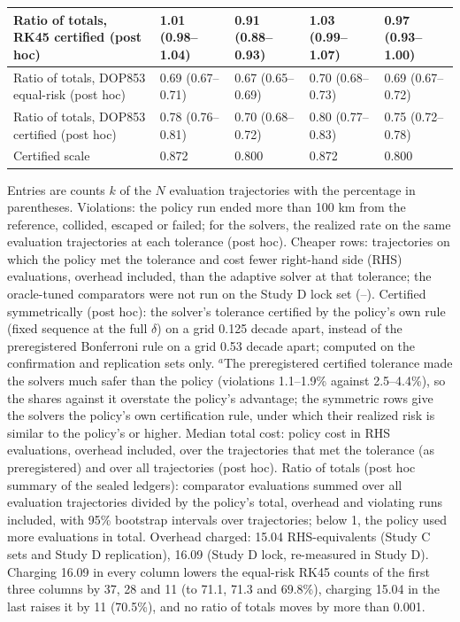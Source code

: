 \documentclass[10pt,letterpaper]{article}
\newlength\savedwidth
\newcommand\thickhline{\noalign{\global\savedwidth\arrayrulewidth\global\arrayrulewidth 2pt}%
\hline
\noalign{\global\arrayrulewidth\savedwidth}}
\begin{document}
\begin{table}[!htbp]
\begin{tabular}{|L{1.55in}|L{0.95in}|L{0.95in}|L{0.8in}|L{0.8in}|}
Ratio of totals, RK45 certified (post hoc) & 1.01 (0.98--1.04) & 0.91 (0.88--0.93) & 1.03 (0.99--1.07) & 0.97 (0.93--1.00) \\ \hline
Ratio of totals, DOP853 equal-risk (post hoc) & 0.69 (0.67--0.71) & 0.67 (0.65--0.69) & 0.70 (0.68--0.73) & 0.69 (0.67--0.72) \\ \hline
Ratio of totals, DOP853 certified (post hoc) & 0.78 (0.76--0.81) & 0.70 (0.68--0.72) & 0.80 (0.77--0.83) & 0.75 (0.72--0.78) \\ \thickhline
Certified scale & 0.872 & 0.800 & 0.872 & 0.800 \\ \hline
\end{tabular}
\begin{flushleft} Entries are counts $k$ of the $N$ evaluation trajectories with the percentage in parentheses. Violations: the policy run ended more than 100 km from the reference, collided, escaped or failed; for the solvers, the realized rate on the same evaluation trajectories at each tolerance (post hoc). Cheaper rows: trajectories on which the policy met the tolerance and cost fewer right-hand side (RHS) evaluations, overhead included, than the adaptive solver at that tolerance; the oracle-tuned comparators were not run on the Study D lock set (--). Certified symmetrically (post hoc): the solver's tolerance certified by the policy's own rule (fixed sequence at the full $\delta$) on a grid 0.125 decade apart, instead of the preregistered Bonferroni rule on a grid 0.53 decade apart; computed on the confirmation and replication sets only. $^{a}$The preregistered certified tolerance made the solvers much safer than the policy (violations 1.1--1.9\% against 2.5--4.4\%), so the shares against it overstate the policy's advantage; the symmetric rows give the solvers the policy's own certification rule, under which their realized risk is similar to the policy's or higher. Median total cost: policy cost in RHS evaluations, overhead included, over the trajectories that met the tolerance (as preregistered) and over all trajectories (post hoc). Ratio of totals (post hoc summary of the sealed ledgers): comparator evaluations summed over all evaluation trajectories divided by the policy's total, overhead and violating runs included, with 95\% bootstrap intervals over trajectories; below 1, the policy used more evaluations in total. Overhead charged: 15.04 RHS-equivalents (Study C sets and Study D replication), 16.09 (Study D lock, re-measured in Study D). Charging 16.09 in every column lowers the equal-risk RK45 counts of the first three columns by 37, 28 and 11 (to 71.1, 71.3 and 69.8\%), charging 15.04 in the last raises it by 11 (70.5\%), and no ratio of totals moves by more than 0.001.
\end{flushleft}
\label{table3}
\end{table}
\end{document}
